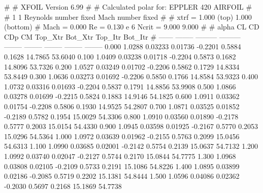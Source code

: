#  
#       XFOIL         Version 6.99
#  
# Calculated polar for: EPPLER 420 AIRFOIL                              
#  
# 1 1 Reynolds number fixed          Mach number fixed         
#  
# xtrf =   1.000 (top)        1.000 (bottom)  
# Mach =   0.000     Re =     0.130 e 6     Ncrit =   9.000  9.000
#  
#   alpha    CL        CD       CDp       CM     Top_Xtr  Bot_Xtr  Top_Itr  Bot_Itr
#  ------ -------- --------- --------- -------- -------- -------- -------- --------
   0.000   1.0288   0.03233   0.01736  -0.2201   0.5884   0.1628  14.7865  53.6040
   0.100   1.0409   0.03238   0.01718  -0.2204   0.5873   0.1682  14.8096  53.7326
   0.200   1.0527   0.03249   0.01702  -0.2206   0.5862   0.1729  14.8334  53.8449
   0.300   1.0636   0.03273   0.01692  -0.2206   0.5850   0.1766  14.8584  53.9323
   0.400   1.0732   0.03316   0.01693  -0.2204   0.5837   0.1791  14.8856  53.9908
   0.500   1.0866   0.03278   0.01699  -0.2215   0.5824   0.1883  14.9146  54.1825
   0.600   1.0911   0.03362   0.01754  -0.2208   0.5806   0.1930  14.9525  54.2807
   0.700   1.0871   0.03525   0.01852  -0.2189   0.5782   0.1954  15.0029  54.3306
   0.800   1.0910   0.03560   0.01890  -0.2178   0.5777   0.2003  15.0154  54.4330
   0.900   1.0945   0.03598   0.01925  -0.2167   0.5770   0.2053  15.0296  54.5364
   1.000   1.0972   0.03639   0.01962  -0.2155   0.5763   0.2099  15.0456  54.6313
   1.100   1.0990   0.03685   0.02001  -0.2142   0.5754   0.2139  15.0637  54.7132
   1.200   1.0992   0.03740   0.02047  -0.2127   0.5744   0.2170  15.0844  54.7775
   1.300   1.0968   0.03808   0.02105  -0.2109   0.5733   0.2191  15.1086  54.8226
   1.400   1.0895   0.03899   0.02186  -0.2085   0.5719   0.2202  15.1381  54.8444
   1.500   1.0596   0.04086   0.02362  -0.2030   0.5697   0.2168  15.1869  54.7738
